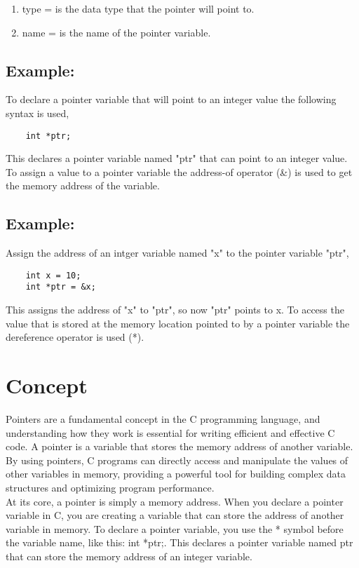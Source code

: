 \documentclass[12pt, letterpaper]{report}
\begin{document}
\begin{enumerate}
	\item type = is the data type that the pointer will point to.
	\item name = is the name of the pointer variable.
\end{enumerate}


\subsection*{Example:}
To declare a pointer variable that will point to an integer value the 
following syntax is used,
\begin{lstlisting}
	int *ptr;
\end{lstlisting}
This declares a pointer variable named "ptr" that can point to an integer 
value.\\

To assign  a value to a pointer variable the address-of operator (\&) is used 
to get the memory address of the variable.\\

\subsection*{Example:}
Assign the address of an intger variable named "x" to the pointer variable 
"ptr",
\begin{lstlisting}
	int x = 10;
	int *ptr = &x;
\end{lstlisting}
This assigns the address of "x" to "ptr", so now "ptr" points to x.
To access the value that is stored at the memory location pointed to by a
pointer variable the dereference operator is used (*).\\

\section{Concept}
Pointers are a fundamental concept in the C programming language, 
and understanding how they work is essential for writing efficient and 
effective C code. A pointer is a variable that stores the memory address of 
another variable. By using pointers, C programs can directly access and 
manipulate the values of other variables in memory, providing a powerful tool 
for building complex data structures and optimizing program performance.\\

At its core, a pointer is simply a memory address. When you declare a pointer 
variable in C, you are creating a variable that can store the address of 
another variable in memory. To declare a pointer variable, you use the * 
symbol before the variable name, like this: int *ptr;. This declares a pointer
variable named ptr that can store the memory address of an integer variable.\\
\end{document}
